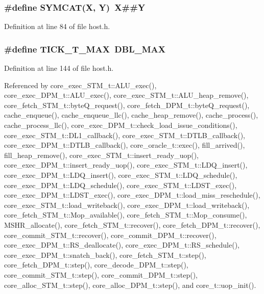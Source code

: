 \subsubsection[{SYMCAT}]{\setlength{\rightskip}{0pt plus 5cm}\#define SYMCAT(X, \/  Y)~X\#\#Y}\label{host_8h_8beb413c9494d7b451c75f743c749c40}




Definition at line 84 of file host.h.
\subsubsection[{TICK\_\-T\_\-MAX}]{\setlength{\rightskip}{0pt plus 5cm}\#define TICK\_\-T\_\-MAX~DBL\_\-MAX}\label{host_8h_d6479e80718c30aee08a7e9cc5cf9668}




Definition at line 144 of file host.h.

Referenced by core\_\-exec\_\-STM\_\-t::ALU\_\-exec(), core\_\-exec\_\-DPM\_\-t::ALU\_\-exec(), core\_\-exec\_\-STM\_\-t::ALU\_\-heap\_\-remove(), core\_\-fetch\_\-STM\_\-t::byteQ\_\-request(), core\_\-fetch\_\-DPM\_\-t::byteQ\_\-request(), cache\_\-enqueue(), cache\_\-enqueue\_\-llc(), cache\_\-heap\_\-remove(), cache\_\-process(), cache\_\-process\_\-llc(), core\_\-exec\_\-DPM\_\-t::check\_\-load\_\-issue\_\-conditions(), core\_\-exec\_\-STM\_\-t::DL1\_\-callback(), core\_\-exec\_\-STM\_\-t::DTLB\_\-callback(), core\_\-exec\_\-DPM\_\-t::DTLB\_\-callback(), core\_\-oracle\_\-t::exec(), fill\_\-arrived(), fill\_\-heap\_\-remove(), core\_\-exec\_\-STM\_\-t::insert\_\-ready\_\-uop(), core\_\-exec\_\-DPM\_\-t::insert\_\-ready\_\-uop(), core\_\-exec\_\-STM\_\-t::LDQ\_\-insert(), core\_\-exec\_\-DPM\_\-t::LDQ\_\-insert(), core\_\-exec\_\-STM\_\-t::LDQ\_\-schedule(), core\_\-exec\_\-DPM\_\-t::LDQ\_\-schedule(), core\_\-exec\_\-STM\_\-t::LDST\_\-exec(), core\_\-exec\_\-DPM\_\-t::LDST\_\-exec(), core\_\-exec\_\-DPM\_\-t::load\_\-miss\_\-reschedule(), core\_\-exec\_\-STM\_\-t::load\_\-writeback(), core\_\-exec\_\-DPM\_\-t::load\_\-writeback(), core\_\-fetch\_\-STM\_\-t::Mop\_\-available(), core\_\-fetch\_\-STM\_\-t::Mop\_\-consume(), MSHR\_\-allocate(), core\_\-fetch\_\-STM\_\-t::recover(), core\_\-fetch\_\-DPM\_\-t::recover(), core\_\-commit\_\-STM\_\-t::recover(), core\_\-commit\_\-DPM\_\-t::recover(), core\_\-exec\_\-DPM\_\-t::RS\_\-deallocate(), core\_\-exec\_\-DPM\_\-t::RS\_\-schedule(), core\_\-exec\_\-DPM\_\-t::snatch\_\-back(), core\_\-fetch\_\-STM\_\-t::step(), core\_\-fetch\_\-DPM\_\-t::step(), core\_\-decode\_\-DPM\_\-t::step(), core\_\-commit\_\-STM\_\-t::step(), core\_\-commit\_\-DPM\_\-t::step(), core\_\-alloc\_\-STM\_\-t::step(), core\_\-alloc\_\-DPM\_\-t::step(), and core\_\-t::uop\_\-init().

